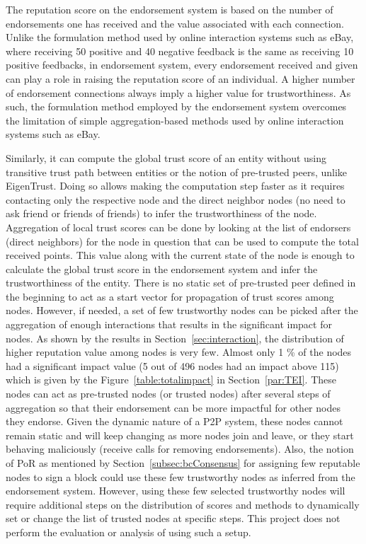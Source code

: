 The reputation score on the endorsement system is based on the number of
endorsements one has received and the value associated with each connection.
Unlike the formulation method used by online interaction systems such as eBay,
where receiving 50 positive and 40 negative feedback is the same as receiving
10 positive feedbacks, in endorsement system, every endorsement received and
given can play a role in raising the reputation score of an individual. A
higher number of endorsement connections always imply a higher value for
trustworthiness. As such, the formulation method employed by the endorsement
system overcomes the limitation of simple aggregation-based methods used by
online interaction systems such as eBay. \par

Similarly, it can compute the global trust score of an entity without using
transitive trust path between entities or the notion of pre-trusted peers,
unlike EigenTrust. Doing so allows making the computation step faster as it
requires contacting only the respective node and the direct neighbor nodes (no
need to ask friend or friends of friends) to infer the trustworthiness of the
node. Aggregation of local trust scores can be done by looking at the list of
endorsers (direct neighbors) for the node in question that can be used to
compute the total received points. This value along with the current state of
the node is enough to calculate the global trust score in the endorsement
system and infer the trustworthiness of the entity. There is no static set of
pre-trusted peer defined in the beginning to act as a start vector for
propagation of trust scores among nodes. However, if needed, a set of few
trustworthy nodes can be picked after the aggregation of enough interactions
that results in the significant impact for nodes. As shown by the results in
Section~\ref{sec:interaction}, the distribution of higher reputation value
among nodes is very few. Almost only 1 \% of the nodes had a significant impact
value (5 out of 496 nodes had an impact above 115) which is given by the
Figure~\ref{table:totalimpact} in Section~\ref{par:TEI}. These nodes can act as
pre-trusted nodes (or trusted nodes) after several steps of aggregation so that
their endorsement can be more impactful for other nodes they endorse. Given the
dynamic nature of a P2P system, these nodes cannot remain static and will keep
changing as more nodes join and leave, or they start behaving maliciously
(receive calls for removing endorsements). Also, the notion of \ac{PoR} as
mentioned by Section~\ref{subsec:bcConsensus} for assigning few reputable nodes
to sign a block could use these few trustworthy nodes as inferred from the
endorsement system. However, using these few selected trustworthy nodes will
require additional steps on the distribution of scores and methods to
dynamically set or change the list of trusted nodes at specific steps. This
project does not perform the evaluation or analysis of using such a setup. \par

